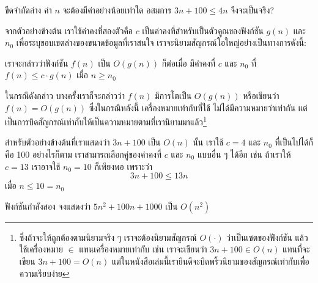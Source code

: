 \begin{quiz}{ขีดจำกัด{\wbr}ล่าง}
ค่า $n$ จะ{\wbr}ต้อง{\wbr}มี{\wbr}ค่า{\wbr}อย่าง{\wbr}น้อย{\wbr}เท่าใด อสมการ $3n+100\leq 4n$ จึง{\wbr}จะ{\wbr}เป็นจริง?
\end{quiz}

จาก{\wbr}ตัวอย่าง{\wbr}ข้างต้น เรา{\wbr}ใช้{\wbr}ค่าคงที่{\wbr}สอง{\wbr}ตัว{\wbr}คือ $c$ เป็น{\wbr}ค่าคงที่{\wbr}สำหรับ{\wbr}เป็น{\wbr}ตัวคูณ{\wbr}ของ{\wbr}ฟังก์ชัน{\wbr}
$g(n)$ และ $n_0$ เพื่อ{\wbr}ระบุ{\wbr}ขอบเขต{\wbr}ล่าง{\wbr}ของ{\wbr}ขนาด{\wbr}ข้อมูล{\wbr}ที่{\wbr}เรา{\wbr}สนใจ{\wbr}
เรา{\wbr}จะ{\wbr}นิยาม{\wbr}สัญกรณ์{\wbr}โอ{\wbr}ใหญ่{\wbr}อย่าง{\wbr}เป็นทางการ{\wbr}ดังนี้:

เรา{\wbr}จะ{\wbr}กล่าว{\wbr}ว่า{\wbr}ฟังก์ชัน $f(n)$ เป็น $O(g(n))$ ก็{\wbr}ต่อเมื่อ มี{\wbr}ค่าคงที่ $c$ และ $n_0$ ที่{\wbr}
$f(n) \leq c\cdot g(n)$ เมื่อ $n\geq n_0$

ใน{\wbr}กรณี{\wbr}ดังกล่าว บาง{\wbr}ครั้ง{\wbr}เรา{\wbr}ก็{\wbr}จะ{\wbr}กล่าว{\wbr}ว่า $f(n)$ มี{\wbr}การ{\wbr}โต{\wbr}เป็น $O(g(n))$ หรือ{\wbr}เขียน{\wbr}ว่า{\wbr}
$f(n)=O(g(n))$ ซึ่ง{\wbr}ใน{\wbr}กรณี{\wbr}หลัง{\wbr}นี้ เครื่องหมาย{\wbr}เท่า{\wbr}กับ{\wbr}ที่{\wbr}ใช้ ไม่{\wbr}ได้{\wbr}มี{\wbr}ความหมาย{\wbr}ว่า{\wbr}เท่า{\wbr}กัน{\wbr}
แต่{\wbr}เป็น{\wbr}การ{\wbr}บิด{\wbr}สัญกรณ์{\wbr}เท่า{\wbr}กับ{\wbr}ให้{\wbr}เป็น{\wbr}ความหมาย{\wbr}ตาม{\wbr}ที่{\wbr}เรา{\wbr}นิยาม{\wbr}มา{\wbr}แล้ว\footnote{ซึ่ง{\wbr}ถ้า{\wbr}จะ{\wbr}ให้{\wbr}ถูกต้อง{\wbr}ตาม{\wbr}นิยาม{\wbr}จริง{\wbr}
  ๆ เรา{\wbr}จะ{\wbr}ต้อง{\wbr}นิยาม{\wbr}สัญกรณ์ $O(\cdot)$ ว่า{\wbr}เป็น{\wbr}เซต{\wbr}ของ{\wbr}ฟังก์ชัน แล้ว{\wbr}ใช้{\wbr}เครื่องหมาย $\in$
  แทน{\wbr}เครื่องหมาย{\wbr}เท่า{\wbr}กับ เช่น เรา{\wbr}จะ{\wbr}เขียน{\wbr}ว่า $3n+100\in O(n)$ แทน{\wbr}ที่{\wbr}จะ{\wbr}เขียน{\wbr}
  $3n+100=O(n)$
  แต่{\wbr}ใน{\wbr}หนังสือ{\wbr}เล่ม{\wbr}นี้{\wbr}เรา{\wbr}ยินดี{\wbr}จะ{\wbr}บิด{\wbr}พ{\wbr}ริ้ว{\wbr}นิยาม{\wbr}ของ{\wbr}สัญกรณ์{\wbr}เท่า{\wbr}กับ{\wbr}เพื่อ{\wbr}ความ{\wbr}เรียบ{\wbr}ง่าย}

สำหรับ{\wbr}ตัวอย่าง{\wbr}ข้างต้น{\wbr}ที่{\wbr}เรา{\wbr}แสดง{\wbr}ว่า $3n+100$ เป็น $O(n)$ นั้น เรา{\wbr}ใช้ $c=4$ และ{\wbr}
$n_0$ ที่{\wbr}เป็น{\wbr}ไป{\wbr}ได้{\wbr}ก็{\wbr}คือ 100 อย่างไรก็ตาม เรา{\wbr}สามารถ{\wbr}เลือก{\wbr}คู่{\wbr}ของ{\wbr}ค่าคงที่ $c$ และ $n_0$
แบบ{\wbr}อื่น ๆ ได้{\wbr}อีก เช่น ถ้า{\wbr}เรา{\wbr}ให้ $c=13$ เรา{\wbr}อาจ{\wbr}ใช้ $n_0=10$ ก็{\wbr}เพียงพอ เพราะว่า{\wbr}
\[
3n+100 \leq 13n
\]
เมื่อ $n\leq 10 = n_0$

\begin{quiz}{ฟังก์ชัน{\wbr}กำลัง{\wbr}สอง}
จง{\wbr}แสดง{\wbr}ว่า $5n^2 + 100n + 1000$ เป็น $O(n^2)$
\end{quiz}

